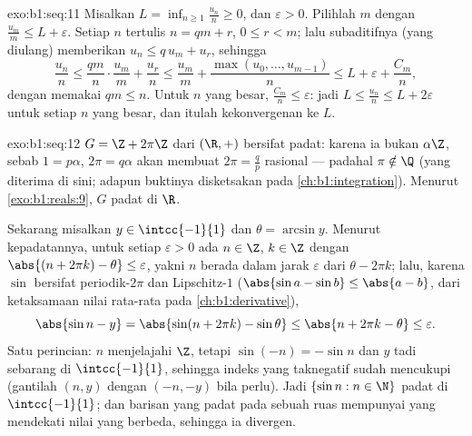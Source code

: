 \begin{solution}{exo:b1:seq:11}
Misalkan $L = \inf_{n \geq 1} \frac{u_n}{n} \geq 0$, dan $\varepsilon >
0$. Pilihlah $m$ dengan $\frac{u_m}{m} \leq L + \varepsilon$. Setiap $n$
tertulis $n = qm + r$, $0 \leq r < m$; lalu subaditifnya (yang diulang) memberikan
$u_n \leq q\,u_m + u_r$, sehingga
\[
\frac{u_n}{n} \leq \frac{q m}{n}\cdot\frac{u_m}{m} + \frac{u_r}{n}
\leq \frac{u_m}{m} + \frac{\max(u_0, \dots, u_{m-1})}{n}
\leq L + \varepsilon + \frac{C_m}{n},
\]
dengan memakai $qm \leq n$. Untuk $n$ yang besar, $\frac{C_m}{n} \leq \varepsilon$:
jadi $L \leq \frac{u_n}{n} \leq L + 2\varepsilon$ untuk setiap $n$ yang besar,
dan itulah kekonvergenan ke $L$.
\end{solution}

\begin{solution}{exo:b1:seq:12}
 $G = \Z + 2\pi\Z$ dari $(\R, +)$ bersifat padat: karena ia bukan
$\alpha\Z$, sebab $1 = p\alpha$, $2\pi = q\alpha$ akan membuat $2\pi =
\frac qp$ rasional --- padahal $\pi \notin \Q$ (yang diterima di sini; adapun buktinya
disketsakan pada \cref{ch:b1:integration}). Menurut \cref{exo:b1:reals:9}, $G$
padat di $\R$.

Sekarang misalkan $y \in \intcc{-1}{1}$ dan $\theta = \arcsin y$. Menurut kepadatannya,
untuk setiap $\varepsilon > 0$ ada $n \in \Z$, $k \in \Z$ dengan
$\abs{(n + 2\pi k) - \theta} \leq \varepsilon$, yakni $n$ berada dalam jarak
$\varepsilon$ dari $\theta - 2\pi k$; lalu, karena $\sin$ bersifat
periodik-$2\pi$ dan Lipschitz-$1$ ($\abs{\sin a - \sin b} \leq
\abs{a - b}$, dari ketaksamaan nilai rata-rata pada
\cref{ch:b1:derivative}),
\[
\abs{\sin n - y} = \abs{\sin(n + 2\pi k) - \sin\theta}
\leq \abs{n + 2\pi k - \theta} \leq \varepsilon .
\]
Satu perincian: $n$ menjelajahi $\Z$, tetapi $\sin(-n) = -\sin n$ dan $y$
tadi sebarang di $\intcc{-1}{1}$, sehingga indeks yang taknegatif sudah mencukupi
(gantilah $(n, y)$ dengan $(-n, -y)$ bila perlu). Jadi $\{\sin n : n \in
\N\}$ padat di $\intcc{-1}{1}$; dan barisan yang padat pada sebuah ruas mempunyai
 yang mendekati nilai yang berbeda, sehingga ia divergen.
\end{solution}

